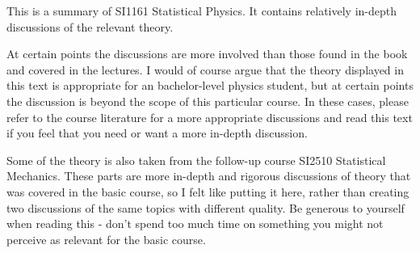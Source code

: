 This is a summary of SI1161 Statistical Physics. It contains relatively in-depth discussions of the relevant theory.

At certain points the discussions are more involved than those found in the book and covered in the lectures. I would of course argue that the theory displayed in this text is appropriate for an bachelor-level physics student, but at certain points the discussion is beyond the scope of this particular course. In these cases, please refer to the course literature for a more appropriate discussions and read this text if you feel that you need or want a more in-depth discussion.

Some of the theory is also taken from the follow-up course SI2510 Statistical Mechanics. These parts are more in-depth and rigorous discussions of theory that was covered in the basic course, so I felt like putting it here, rather than creating two discussions of the same topics with different quality. Be generous to yourself when reading this - don't spend too much time on something you might not perceive as relevant for the basic course.